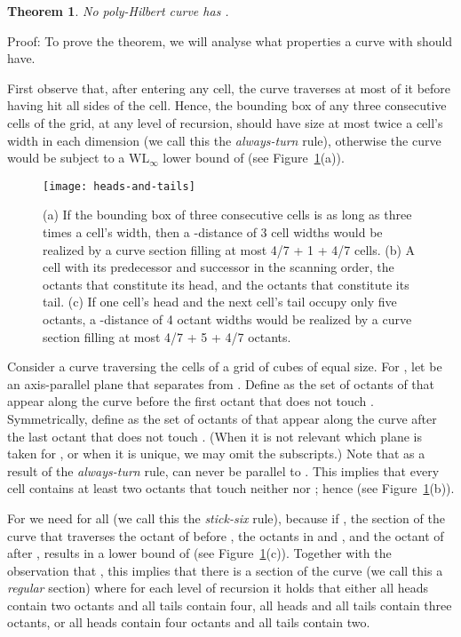\documentclass[11pt,a4paper]{article}
\def\WLMax{\ensuremath{\mathrm{WL}_\infty}\xspace}
\newtheorem{theorem}{Theorem}
\newenvironment{proof}{Proof:}{\qed}
\def\squareforqed{\hbox{\rlap{}}}
\def\qed{\ifmmode\squareforqed\else{\unskip\nobreak\hfil
\penalty50\hskip1em\null\nobreak\hfil\squareforqed
\parfillskip=0pt\finalhyphendemerits=0\endgraf}\fi}
\begin{document}
\begin{theorem}\label{th:WLMaxlbd}
No poly-Hilbert curve has .
\end{theorem}
\begin{proof}
To prove the theorem, we will analyse what properties a curve with  should have.

First observe that, after entering any cell, the curve traverses at most  of it before having hit all sides of the cell. Hence, the bounding box of any three consecutive cells of the grid, at any level of recursion, should have size at most twice a cell's width in each dimension (we call this the \emph{always-turn} rule), otherwise the curve would be subject to a \WLMax lower bound of  (see Figure~\ref{fig:WLMaxlbd}(a)).

\begin{figure}
\centering
\texttt{[image: heads-and-tails]}
\caption{(a) If the bounding box of three consecutive cells is as long as three times a cell's width, then a -distance of 3 cell widths would be realized by a curve section filling at most 4/7 + 1 + 4/7 cells.\quad
(b) A cell  with its predecessor and successor in the scanning order, the octants that constitute its head, and the octants that constitute its tail.\quad
(c) If one cell's head and the next cell's tail occupy only five octants, a -distance of 4 octant widths would be realized by a curve section filling at most 4/7 + 5 + 4/7 octants.}
\label{fig:WLMaxlbd}
\end{figure}

Consider a curve traversing the cells  of a grid of  cubes of equal size. For , let  be an axis-parallel plane that separates  from . Define  as the set of octants of  that appear along the curve before the first octant that does not touch . Symmetrically, define  as the set of octants of  that appear along the curve after the last octant that does not touch . (When it is not relevant which plane is taken for , or when it is unique, we may omit the subscripts.) Note that as a result of the \emph{always-turn} rule,  can never be parallel to . This implies that every cell  contains at least two octants that touch neither  nor ; hence  (see Figure~\ref{fig:WLMaxlbd}(b)).

For  we need  for all  (we call this the \emph{stick-six} rule), because if , the section of the curve that traverses the octant of  before , the octants in  and , and the octant of  after , results in a  lower bound of  (see Figure~\ref{fig:WLMaxlbd}(c)). Together with the observation that , this implies that there is a section of the curve (we call this a \emph{regular} section) where for each level of recursion it holds that either all heads contain two octants and all tails contain four, all heads and all tails contain three octants, or all heads contain four octants and all tails contain two.


\end{proof}
\end{document}
